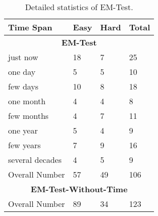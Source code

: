 \begin{table}[t!]
\centering
\scriptsize
\caption{Detailed statistics of EM-Test.}
\label{tab:em_test}
\vskip 0.15in
\vspace{-2mm}
\setlength{\tabcolsep}{1.1mm}
\begin{tabular}{llll}
\toprule
\textbf{Time Span} & \textbf{Easy}  & \textbf{Hard} & \textbf{Total} \\
\midrule
\multicolumn{4}{c}{\textbf{EM-Test}}\\
\midrule
just now & 18 & 7 & 25 \\
one day & 5 & 5 & 10 \\
few days & 10 & 8 & 18 \\
one month & 4 & 4 & 8 \\
few months & 4 & 7 & 11 \\
one year & 5 & 4 & 9 \\
few years & 7 & 9 & 16 \\
several decades & 4 & 5 & 9 \\
Overall Number & 57 & 49 & 106 \\
\midrule
\multicolumn{4}{c}{\textbf{EM-Test-Without-Time}}\\
\midrule
Overall Number & 89 & 34 & 123 \\
\bottomrule
\end{tabular}
\vspace{-2mm}
\end{table}